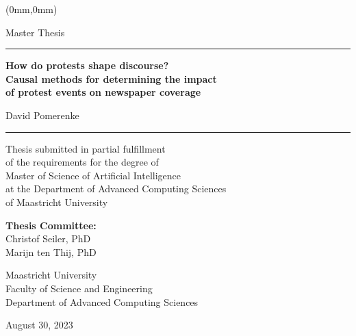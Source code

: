 \begin{textblock*}{\paperwidth}(0mm,0mm)
\begin{centering}
\begin{large}

\vspace{4cm}

Master Thesis

\vspace{1cm}

\rule{5cm}{0.4pt}

\vspace{0.5cm}

\textbf{
{\Huge How do protests shape discourse?}\\
\vspace{0.2cm}
{\huge
Causal methods for determining the impact\\
of protest events on newspaper coverage}
}

\vspace{0.5cm}

{\Large David Pomerenke}

\vspace{0.5cm}

\rule{5cm}{0.4pt}

\vspace{3cm}

Thesis submitted in partial fulfillment\\
of the requirements for the degree of\\
Master of Science of Artificial Intelligence\\
at the Department of Advanced Computing Sciences\\
of Maastricht University

\vspace{1cm}

\textbf{Thesis Committee:}\\
Christof Seiler, PhD\\
Marijn ten Thij, PhD

\vspace{3cm}

Maastricht University\\
Faculty of Science and Engineering\\
Department of Advanced Computing Sciences

\vspace{1cm}

August 30, 2023

\end{large}
\end{centering}
\end{textblock*}
\vspace*{\fill}
\thispagestyle{empty}
\newpage


